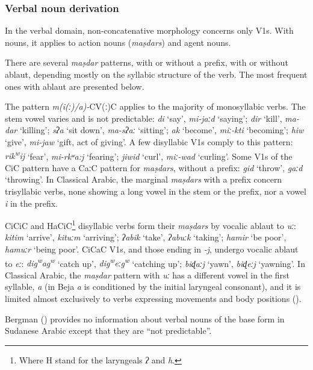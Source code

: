 \documentclass[output=paper]{langsci/langscibook}
\begin{document}
 \subsubsection{Verbal noun derivation}

In the verbal domain, non-concatenative morphology concerns only V1s. With nouns, it applies to action nouns (\textit{maṣdars}) and agent nouns.

There are several \textit{maṣdar} patterns, with or without a prefix, with or without ablaut, depending mostly on the syllabic structure of the verb. The most frequent ones with ablaut are presented below.

The pattern \textit{m(i(ː)/a)-}CV(ː)C applies to the majority of monosyllabic verbs. The stem vowel varies and is not predictable: \textit{di} ‘say’, \textit{mi-jaːd} ‘saying’; \textit{dir} ‘kill’, \textit{ma-dar} ‘killing’; \textit{sʔa} ‘sit down’, \textit{ma\nobreakdash-sʔaː} ‘sitting’; \textit{ak} ‘become’, \textit{miː-kti} ‘becoming’; \textit{hiw} ‘give’, \textit{mi-jaw} ‘gift, act of giving’. A few disyllabic V1s comply to this pattern: \textit{rik\textsuperscript{w}}\textit{ij} ‘fear’, \textit{mi-rkʷa:j} ‘fearing’; \textit{jiwid} ‘curl’, \textit{miː-wad} ‘curling’. Some V1s of the CiC pattern have a CaːC pattern for \textit{maṣdars}, without a prefix: \textit{gid} ‘throw’, \textit{gaːd} ‘throwing’. In Classical Arabic, the marginal \textit{maṣdars} with a prefix concern trisyllabic verbs, none showing a long vowel in the stem or the prefix, nor a vowel \textit{i} in the prefix.

CiCiC and HaCiC\footnote{Where H stand for the laryngeals \textit{ʔ} and \textit{h}.} disyllabic verbs form their \textit{maṣdars} by vocalic ablaut to \textit{uː}: \textit{kitim} ‘arrive’, \textit{kituːm} ‘arriving’; \textit{ʔabik} ‘take’, \textit{ʔabuːk} ‘taking’; \textit{hamir} ‘be poor’, \textit{hamuːr} ‘being poor’. CiCaC V1s, and those ending in \textit{{}-j}, undergo vocalic ablaut to \textit{eː}: \textit{dig\textsuperscript{w}}\textit{ag\textsuperscript{w}} ‘catch up’, \textit{dig\textsuperscript{w}}\textit{eːg\textsuperscript{w}} ‘catching up’; \textit{biɖaːj} ‘yawn’, \textit{biɖeːj} ‘yawning’. In Classical Arabic, the \textit{maṣdar} pattern with \textit{uː} has a different vowel in the first syllable, \textit{a} (in Beja \textit{a} is conditioned by the initial laryngeal consonant), and it is limited almost exclusively to verbs expressing movements and body positions (\citealt[81]{BlachèreGaudefroy-Demombynes1975}). 

Bergman (\citeyear[35]{Bergman2002}) provides no information about verbal nouns of the base form in Sudanese Arabic except that they are “not predictable”. 
\end{document}
